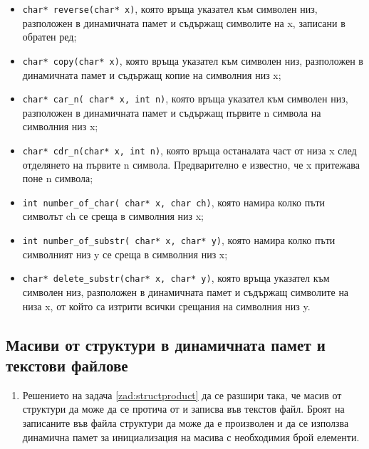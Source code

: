{\begin{enumerate}
\begin{itemize}
\item \texttt{char* reverse(char* x)}, която връща указател към символен низ, разположен в динамичната памет и съдържащ символите на x, записани в обратен ред;
\item  \texttt{char* copy(char* x)}, която връща указател към символен низ, разположен в динамичната памет и съдържащ копие на символния низ x;
\item  \texttt{char* car\_n( char* x, int n)}, която връща указател към символен низ, разположен в динамичната памет и съдържащ първите n символа на символния низ x;
\item \texttt{char* cdr\_n(char* x, int n)}, която връща останалата част от низа x след отделянето на първите n символа. Предварително е известно, че x притежава поне n символа;
\item \texttt{int number\_of\_char( char* x, char ch)}, която намира колко пъти символът ch се среща в символния низ x;
\item \texttt{int number\_of\_substr( char* x, char* y)}, която намира колко пъти символният низ y се среща в символния низ x;
\item \texttt{char* delete\_substr(char* x, char* y)}, която връща указател към символен низ, разположен в динамичната памет и съдържащ символите на низа x, от който са изтрити всички срещания на символния низ y.

\end{itemize}

\end{enumerate}


\subsection {Масиви от структури в динамичната памет и текстови файлове}

\begin{enumerate}[resume]

\item Решението на задача \ref{zad:structproduct} да се разшири така, че масив от структури да може да се протича от и записва във текстов файл. Броят на записаните във файла структури да може да е произволен и да се използва динамична памет за инициализация на масива с необходимия брой елементи.


\end{enumerate}}
